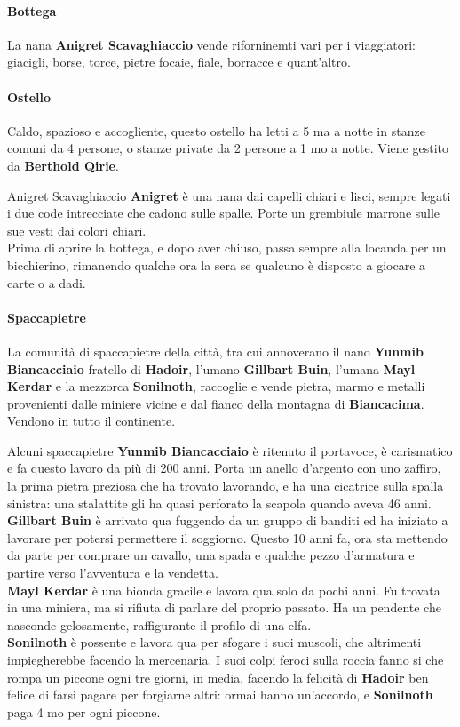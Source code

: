 \documentclass[10pt,twoside,onecolumn,openany]{book}
\begin{document}
\begin{multicols}{2}
\paragraph{Bottega}
La nana \textbf{Anigret Scavaghiaccio} vende riforninemti vari per i viaggiatori: giacigli, borse, torce, pietre focaie, fiale, borracce e quant'altro.
\paragraph{Ostello}
Caldo, spazioso e accogliente, questo ostello ha letti a 5 ma a notte in stanze comuni da 4 persone, o stanze private da 2 persone a 1 mo a notte. Viene gestito da \textbf{Berthold Qirie}.
\begin{paperbox}{{Anigret Scavaghiaccio}}
\textbf{Anigret} è una nana dai capelli chiari e lisci, sempre legati i due code intrecciate che cadono sulle spalle. Porte un grembiule marrone sulle sue vesti dai colori chiari.\\
Prima di aprire la bottega, e dopo aver chiuso, passa sempre alla locanda per un bicchierino, rimanendo qualche ora la sera se qualcuno è disposto a giocare a carte o a dadi.
\end{paperbox}
\end{multicols}
\paragraph{Spaccapietre} La comunità di spaccapietre della città, tra cui annoverano il nano \textbf{Yunmib Biancacciaio} fratello di \textbf{Hadoir}, l'umano \textbf{Gillbart Buin}, l'umana \textbf{Mayl Kerdar} e la mezzorca \textbf{Sonilnoth}, raccoglie e vende pietra, marmo e metalli provenienti dalle miniere vicine e dal fianco della montagna di \textbf{Biancacima}. Vendono in tutto il continente.
\begin{paperbox}{{Alcuni spaccapietre}}
\textbf{Yunmib Biancacciaio} è ritenuto il portavoce, è carismatico e fa questo lavoro da più di 200 anni. Porta un anello d'argento con uno zaffiro, la prima pietra preziosa che ha trovato lavorando, e ha una cicatrice sulla spalla sinistra: una stalattite gli ha quasi perforato la scapola quando aveva 46 anni.\\
\textbf{Gillbart Buin} è arrivato qua fuggendo da un gruppo di banditi ed ha iniziato a lavorare per potersi permettere il soggiorno. Questo 10 anni fa, ora sta mettendo da parte per comprare un cavallo, una spada e qualche pezzo d'armatura e partire verso l'avventura e la vendetta.\\
\textbf{Mayl Kerdar} è una bionda gracile e lavora qua solo da pochi anni. Fu trovata in una miniera, ma si rifiuta di parlare del proprio passato. Ha un pendente che nasconde gelosamente, raffigurante il profilo di una elfa.\\
\textbf{Sonilnoth} è possente e lavora qua per sfogare i suoi muscoli, che altrimenti impiegherebbe facendo la mercenaria. I suoi colpi feroci sulla roccia fanno si che rompa un piccone ogni tre giorni, in media, facendo la felicità di \textbf{Hadoir} ben felice di farsi pagare per forgiarne altri: ormai hanno un'accordo, e \textbf{Sonilnoth} paga 4 mo per ogni piccone.
\end{paperbox}
\newpage
\end{document}
